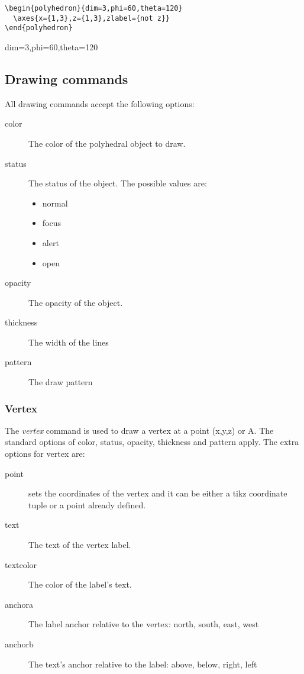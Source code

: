 \documentclass[a4paper,10pt]{article}
\begin{document}
\begin{center}
  \begin{minipage}{0.6\textwidth}
  \begin{lstlisting}
\begin{polyhedron}{dim=3,phi=60,theta=120}
  \axes{x={1,3},z={1,3},zlabel={not z}}
\end{polyhedron}
  \end{lstlisting}
  \end{minipage}
  \qquad\qquad
  \begin{minipage}{0.2\textwidth}
    \begin{polyhedron}{dim=3,phi=60,theta=120}
    \end{polyhedron}
  \end{minipage}
\end{center}



\subsection{Drawing commands}

All drawing commands accept the following options:
\begin{description}
 \item[color] The color of the polyhedral object to draw.
 \item[status] The status of the object. The possible values are:
    \begin{itemize}
     \item normal
     \item focus
     \item alert
     \item open
    \end{itemize}
 \item[opacity] The opacity of the object.
 \item[thickness] The width of the lines
 \item[pattern] The draw pattern
\end{description}

\subsubsection{Vertex}

The \emph{vertex} command is used to draw a vertex at a point (x,y,z) or A.
The standard options of  color, status, opacity, thickness and pattern apply.
The extra options for vertex are:
\begin{description}
 \item[point]  sets the coordinates of the vertex and it can be either a tikz
	      coordinate tuple or a point already defined.
 \item[text] The text of the vertex label.
 \item[textcolor] The color of the label's text.
 \item[anchora] The label anchor relative to the vertex: north, south, east,
      west
 \item[anchorb] The text's anchor relative to the label: above, below, right,
      left
\end{description}
\end{document}
